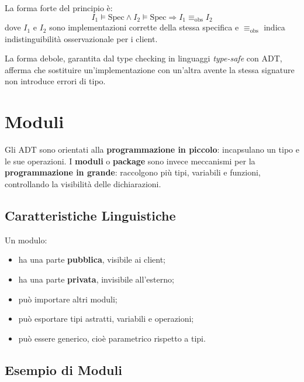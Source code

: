 \documentclass{article}
\begin{document}
La forma forte del principio è:
\[
I_1 \models \mathrm{Spec}
\land
I_2 \models \mathrm{Spec}
\Rightarrow
I_1 \equiv_{\mathrm{obs}} I_2
\]
dove $I_1$ e $I_2$ sono implementazioni corrette della stessa specifica e $\equiv_{\mathrm{obs}}$ indica indistinguibilità osservazionale per i client.

La forma debole, garantita dal type checking in linguaggi \textit{type-safe} con ADT, afferma che sostituire un'implementazione con un'altra avente la stessa signature non introduce errori di tipo.

\section{Moduli}

Gli ADT sono orientati alla \textbf{programmazione in piccolo}: incapsulano un tipo e le sue operazioni. I \textbf{moduli} o \textbf{package} sono invece meccanismi per la \textbf{programmazione in grande}: raccolgono più tipi, variabili e funzioni, controllando la visibilità delle dichiarazioni.

\subsection{Caratteristiche Linguistiche}

Un modulo:
\begin{itemize}
  \item ha una parte \textbf{pubblica}, visibile ai client;
  \item ha una parte \textbf{privata}, invisibile all'esterno;
  \item può importare altri moduli;
  \item può esportare tipi astratti, variabili e operazioni;
  \item può essere generico, cioè parametrico rispetto a tipi.
\end{itemize}

\subsection{Esempio di Moduli}
\end{document}
